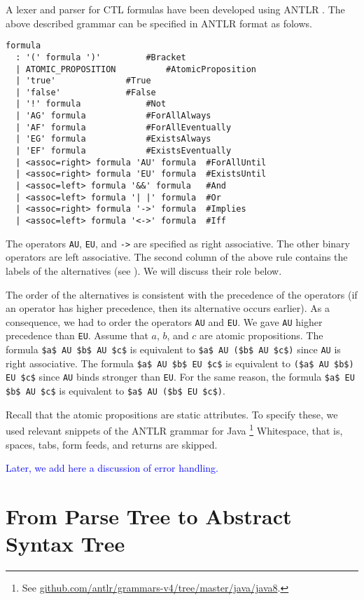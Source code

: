 \documentclass[12pt]{article}
\theoremstyle{definition}
\begin{document}
A lexer and parser for CTL formulas have been developed using ANTLR \cite{P13}.  The above described grammar can be specified in ANTLR format as folows.
\begin{lstlisting}
formula
  : '(' formula ')'			#Bracket
  | ATOMIC_PROPOSITION			#AtomicProposition
  | 'true'				#True
  | 'false'				#False
  | '!' formula				#Not
  | 'AG' formula			#ForAllAlways
  | 'AF' formula			#ForAllEventually
  | 'EG' formula			#ExistsAlways
  | 'EF' formula			#ExistsEventually
  | <assoc=right> formula 'AU' formula  #ForAllUntil
  | <assoc=right> formula 'EU' formula  #ExistsUntil
  | <assoc=left> formula '&&' formula	#And
  | <assoc=left> formula '| |' formula  #Or
  | <assoc=right> formula '->' formula  #Implies
  | <assoc=left> formula '<->' formula	#Iff
\end{lstlisting}
The operators \lstinline{AU}, \lstinline{EU}, and \lstinline{->} are specified as right associative.  The other binary operators are left associative.  The second column of the above rule contains the labels of the alternatives (see \cite[Section~8.2]{P13}).  We will discuss their role below.

The order of the alternatives is consistent with the precedence of the operators (if an operator has higher precedence, then its alternative occurs earlier).  As a consequence, we had to order the operators \lstinline{AU} and \lstinline{EU}.  We gave \lstinline{AU} higher precedence than \lstinline{EU}.  Assume that $a$, $b$, and $c$ are atomic propositions.  The formula \lstinline{$a$ AU $b$ AU $c$} is equivalent to \lstinline{$a$ AU ($b$ AU $c$)} since \lstinline{AU} is right associative.  The formula \lstinline{$a$ AU $b$ EU $c$} is equivalent to \lstinline{($a$ AU $b$) EU $c$} since \lstinline{AU} binds stronger than \lstinline{EU}.  For the same reason, the formula \lstinline{$a$ EU $b$ AU $c$} is equivalent to \lstinline{$a$ AU ($b$ EU $c$)}.

Recall that the atomic propositions are static attributes.  To specify these, we used relevant snippets of the ANTLR grammar for Java%
\footnote{See \href{https://github.com/antlr/grammars-v4/tree/master/java/java8}{github.com/antlr/grammars-v4/tree/master/java/java8}.}
Whitespace, that is, spaces, tabs, form feeds, and returns are skipped.

\textcolor{blue}{Later, we add here a discussion of error handling.}

\section{From Parse Tree to Abstract Syntax Tree}
\end{document}
